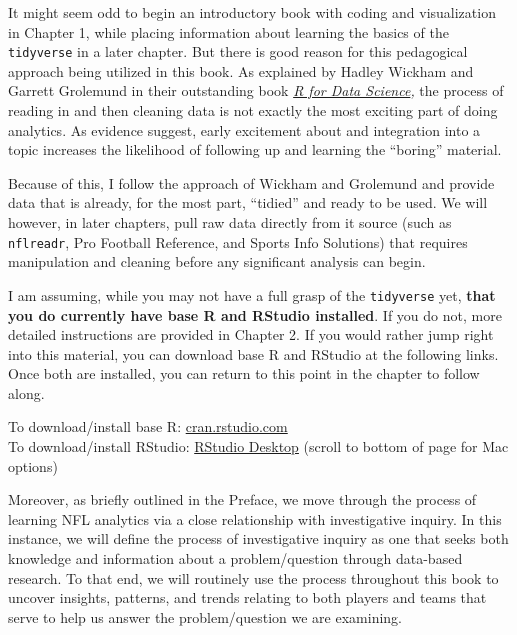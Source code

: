 \documentclass[
  letterpaper,
]{krantz}
\begin{document}
It might seem odd to begin an introductory book with coding and
visualization in Chapter 1, while placing information about learning the
basics of the \texttt{tidyverse} in a later chapter. But there is good
reason for this pedagogical approach being utilized in this book. As
explained by Hadley Wickham and Garrett Grolemund in their outstanding
book \href{https://r4ds.had.co.nz/index.html}{\emph{R for Data
Science}}\emph{,} the process of reading in and then cleaning data is
not exactly the most exciting part of doing analytics. As evidence
suggest, early excitement about and integration into a topic increases
the likelihood of following up and learning the ``boring'' material.

Because of this, I follow the approach of Wickham and Grolemund and
provide data that is already, for the most part, ``tidied'' and ready to
be used. We will however, in later chapters, pull raw data directly from
it source (such as \texttt{nflreadr}, Pro Football Reference, and Sports
Info Solutions) that requires manipulation and cleaning before any
significant analysis can begin.

\begin{tcolorbox}[enhanced jigsaw, left=2mm, toprule=.15mm, opacitybacktitle=0.6, leftrule=.75mm, bottomrule=.15mm, colbacktitle=quarto-callout-important-color!10!white, breakable, colback=white, bottomtitle=1mm, toptitle=1mm, title=\textcolor{quarto-callout-important-color}{\faExclamation}\hspace{0.5em}{Important}, coltitle=black, titlerule=0mm, arc=.35mm, opacityback=0, colframe=quarto-callout-important-color-frame, rightrule=.15mm]

I am assuming, while you may not have a full grasp of the
\texttt{tidyverse} yet, \textbf{that you do currently have base R and
RStudio installed}. If you do not, more detailed instructions are
provided in Chapter 2. If you would rather jump right into this
material, you can download base R and RStudio at the following links.
Once both are installed, you can return to this point in the chapter to
follow along.

To download/install base R:
\href{https://cran.rstudio.com/}{cran.rstudio.com}\\
To download/install RStudio:
\href{https://posit.co/download/rstudio-desktop/}{RStudio Desktop}
(scroll to bottom of page for Mac options)

\end{tcolorbox}

Moreover, as briefly outlined in the Preface, we move through the
process of learning NFL analytics via a close relationship with
investigative inquiry. In this instance, we will define the process of
investigative inquiry as one that seeks both knowledge and information
about a problem/question through data-based research. To that end, we
will routinely use the process throughout this book to uncover insights,
patterns, and trends relating to both players and teams that serve to
help us answer the problem/question we are examining.
\end{document}
